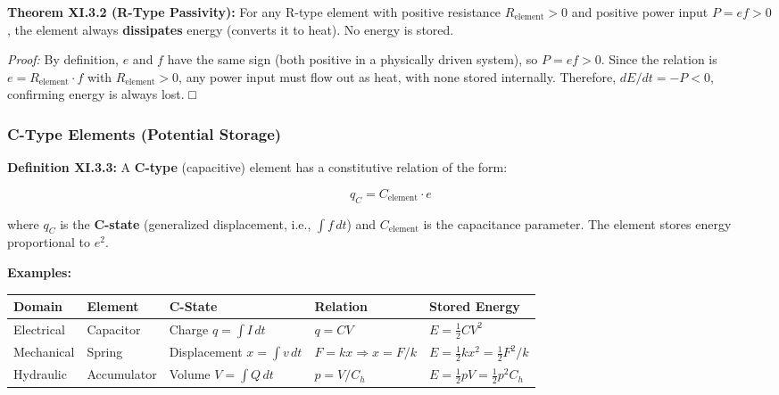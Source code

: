 \documentclass[
]{article}
\begin{document}
\textbf{Theorem XI.3.2 (R-Type Passivity):} For any R-type element with
positive resistance \(R_{\text{element}} > 0\) and positive power input
\(P = ef > 0\), the element always \textbf{dissipates} energy (converts
it to heat). No energy is stored.

\emph{Proof:} By definition, \(e\) and \(f\) have the same sign (both
positive in a physically driven system), so \(P = ef > 0\). Since the
relation is \(e = R_{\text{element}} \cdot f\) with
\(R_{\text{element}} > 0\), any power input must flow out as heat, with
none stored internally. Therefore, \(dE/dt = -P < 0\), confirming energy
is always lost. □

\subsubsection{C-Type Elements (Potential
Storage)}\label{c-type-elements-potential-storage}

\textbf{Definition XI.3.3:} A \textbf{C-type} (capacitive) element has a
constitutive relation of the form:

\[q_C = C_{\text{element}} \cdot e\]

where \(q_C\) is the \textbf{C-state} (generalized displacement, i.e.,
\(\int f\,dt\)) and \(C_{\text{element}}\) is the capacitance parameter.
The element stores energy proportional to \(e^2\).

\textbf{Examples:}

\begin{longtable}[]{@{}
  >{\raggedright\arraybackslash}p{}
  >{\raggedright\arraybackslash}p{}
  >{\raggedright\arraybackslash}p{}
  >{\raggedright\arraybackslash}p{}
  >{\raggedright\arraybackslash}p{}@{}}
\toprule\noalign{}
\begin{minipage}[b]{\linewidth}\raggedright
Domain
\end{minipage} & \begin{minipage}[b]{\linewidth}\raggedright
Element
\end{minipage} & \begin{minipage}[b]{\linewidth}\raggedright
C-State
\end{minipage} & \begin{minipage}[b]{\linewidth}\raggedright
Relation
\end{minipage} & \begin{minipage}[b]{\linewidth}\raggedright
Stored Energy
\end{minipage} \\
\midrule\noalign{}
\endhead
\bottomrule\noalign{}
\endlastfoot
Electrical & Capacitor & Charge \(q = \int I\,dt\) & \(q = CV\) &
\(E = \frac{1}{2}CV^2\) \\
Mechanical & Spring & Displacement \(x = \int v\,dt\) &
\(F = kx \Rightarrow x = F/k\) &
\(E = \frac{1}{2}kx^2 = \frac{1}{2}F^2/k\) \\
Hydraulic & Accumulator & Volume \(V = \int Q\,dt\) & \(p = V/C_h\) &
\(E = \frac{1}{2}pV = \frac{1}{2}p^2 C_h\) \\
\end{longtable}
\end{document}
